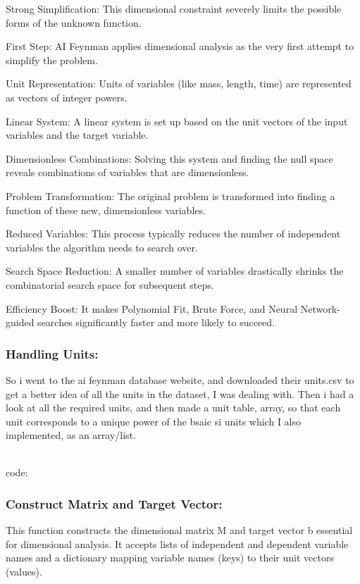 \documentclass{article}
\begin{document}
    Strong Simplification: This dimensional constraint severely limits the possible forms of the unknown function.

    First Step: AI Feynman applies dimensional analysis as the very first attempt to simplify the problem.

    Unit Representation: Units of variables (like mass, length, time) are represented as vectors of integer powers.

    Linear System: A linear system is set up based on the unit vectors of the input variables and the target variable.

    Dimensionless Combinations: Solving this system and finding the null space reveals combinations of variables that are dimensionless.

    Problem Transformation: The original problem is transformed into finding a function of these new, dimensionless variables.

    Reduced Variables: This process typically reduces the number of independent variables the algorithm needs to search over.

    Search Space Reduction: A smaller number of variables drastically shrinks the combinatorial search space for subsequent steps.

    Efficiency Boost: It makes Polynomial Fit, Brute Force, and Neural Network-guided searches significantly faster and more likely to succeed.\\

\subsubsection{Handling Units: }

So i went to the ai feynman database website, and downloaded their units.csv to get a better idea of all the units in the dataset, I was dealing with. Then i had a look at all the required units, and then made a unit table, array, so that each unit corresponds to a unique power of the bsaic si units which I also implemented, as an array/list.\\\

code:\\

\subsubsection{Construct Matrix and Target Vector: }

This function constructs the dimensional matrix M and target vector b essential for dimensional analysis. It accepts lists of independent and dependent variable names and a dictionary mapping variable names (keys) to their unit vectors (values).
\end{document}
